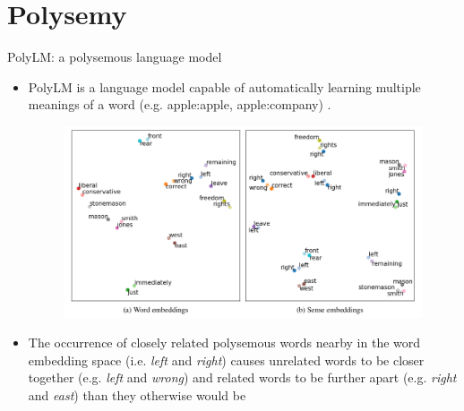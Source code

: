 \documentclass[handout]{beamer}
\begin{document}
\section{Polysemy}

\begin{frame}{PolyLM: a polysemous language model}
\begin{scriptsize}
\begin{itemize}
 \item PolyLM is a language model capable of automatically learning multiple meanings of a word (e.g. apple:apple, apple:company) \cite{ansell2021polylm}.

   \begin{figure}[h]
        	\includegraphics[scale = 0.25]{pics/senseembeddings.png}
        \end{figure}


   \item  The occurrence of closely related polysemous words nearby in the word embedding space (i.e. \textit{left} and \textit{right}) causes unrelated words to be closer together (e.g. \textit{left} and \textit{wrong}) and related words to be further apart (e.g. \textit{right} and \textit{east}) than they otherwise would be


\end{itemize}



\end{scriptsize}
\end{frame}
\end{document}
